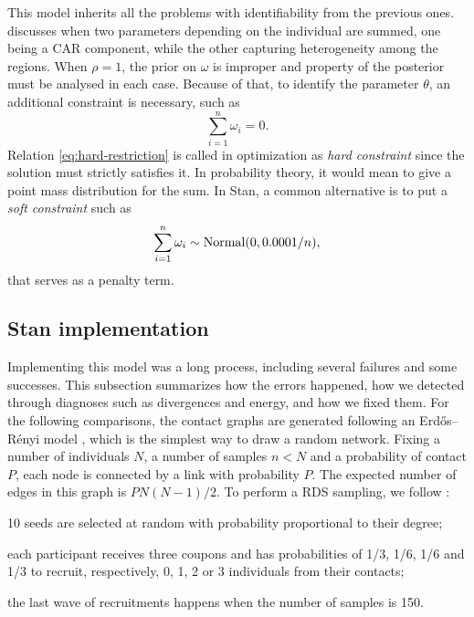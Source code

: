 This model inherits all the problems with identifiability from the previous
ones. \textcite[p. 3470]{xie2006measures} discusses when two parameters depending on the individual are
summed, one being a CAR component, while the other capturing heterogeneity
among the regions. When $\rho = 1$, the prior on $\omega$ is improper and
property of the posterior must be analysed in each case. Because of that, to
identify the parameter $\theta$, an additional constraint is necessary, such
as 
\begin{equation}
  \label{eq:hard-restriction}
  \sum_{i=1}^n \omega_i = 0.
\end{equation}
Relation \eqref{eq:hard-restriction} is called in optimization as {\em hard
constraint} since the solution must strictly satisfies it. In probability
theory, it would mean to give a point mass distribution for the sum.   
In Stan, a common alternative is to put a {\em soft constraint} such as
\begin{equation}
  \label{eq:soft-restriction}
  \sum_{i=1}^n \omega_i \sim \operatorname{Normal}(0, 0.0001/n), 
\end{equation}
that serves as a penalty term. 

\subsection{Stan implementation}
\label{sec:stan-implementation-rds}

Implementing this model was a long process, including several failures and
some successes. This subsection summarizes how the errors happened, how we
detected through diagnoses such as divergences and energy, and how we fixed
them. For the following comparisons, the contact graphs are generated
following an Erdős–Rényi model \cite{erdos1960evolution}, which is the
simplest way to draw a random network. Fixing a number of individuals $N$,
a number of samples $n < N$ and a probability of contact $P$, each node is
connected by a link with probability $P$. The expected number of edges in this
graph is $PN(N-1)/2$. To perform a RDS sampling, we follow 
\textcite[p. 14670]{baraff2016estimating}: 

\begin{alineas}
  \item 10 seeds are selected at random with probability proportional to their
  degree; 
  \item each participant receives three coupons and has probabilities of 1/3,
  1/6, 1/6 and 1/3 to recruit, respectively, 0, 1, 2 or 3 individuals from their
  contacts;
  \item the last wave of recruitments happens when the number of samples
  is 150. 
\end{alineas}

